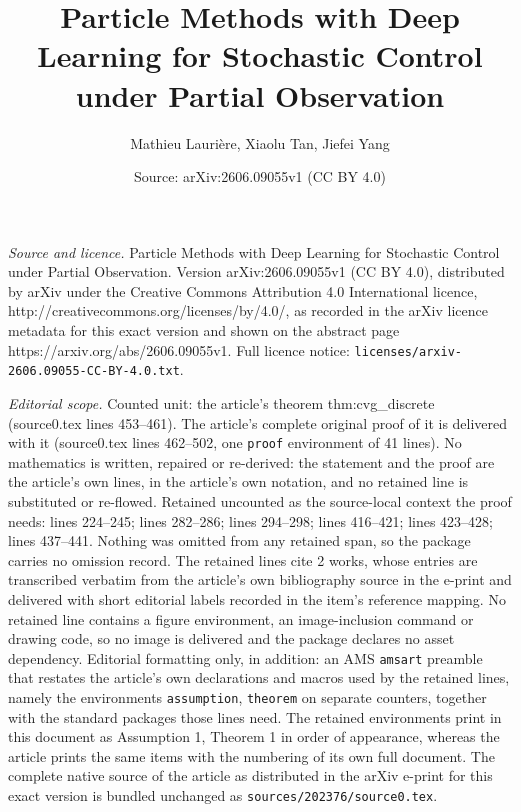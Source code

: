 \documentclass[10pt,a4paper]{amsart}
\title{Particle Methods with Deep Learning for Stochastic Control \\ under Partial Observation}
\author{Mathieu Lauri\`ere, Xiaolu Tan, Jiefei Yang}
\date{Source: arXiv:2606.09055v1 (CC BY 4.0)}
\begin{document}
\maketitle

\noindent\emph{Source and licence.} Particle Methods with Deep Learning for Stochastic Control \\ under Partial Observation. Version arXiv:2606.09055v1 (CC BY 4.0), distributed by arXiv under the Creative Commons Attribution 4.0 International licence, http://creativecommons.org/licenses/by/4.0/, as recorded in the arXiv licence metadata for this exact version and shown on the abstract page https://arxiv.org/abs/2606.09055v1. Full licence notice: \texttt{licenses/arxiv-2606.09055-CC-BY-4.0.txt}.\par\smallskip

\noindent\textit{Editorial scope.} Counted unit: the article's theorem thm:cvg\_discrete (source0.tex lines 453--461). The article's complete original proof of it is delivered with it (source0.tex lines 462--502, one \texttt{proof} environment of 41 lines). No mathematics is written, repaired or re-derived: the statement and the proof are the article's own lines, in the article's own notation, and no retained line is substituted or re-flowed.  Retained uncounted as the source-local context the proof needs: lines 224--245; lines 282--286; lines 294--298; lines 416--421; lines 423--428; lines 437--441.  Nothing was omitted from any retained span, so the package carries no omission record.  The retained lines cite 2 works, whose entries are transcribed verbatim from the article's own bibliography source in the e-print and delivered with short editorial labels recorded in the item's reference mapping.  No retained line contains a figure environment, an image-inclusion command or drawing code, so no image is delivered and the package declares no asset dependency.  Editorial formatting only, in addition: an AMS \texttt{amsart} preamble that restates the article's own declarations and macros used by the retained lines, namely the environments \texttt{assumption}, \texttt{theorem} on separate counters, together with the standard packages those lines need.  The retained environments print in this document as Assumption 1, Theorem 1 in order of appearance, whereas the article prints the same items with the numbering of its own full document.  The complete native source of the article as distributed in the arXiv e-print for this exact version is bundled unchanged as \texttt{sources/202376/source0.tex}.
\end{document}
